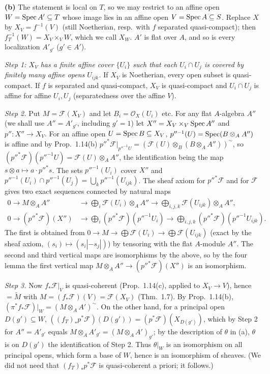 \documentclass[11pt]{article}
\begin{document}
\textbf{(b)} The statement is local on $T$, so we may restrict to an affine open $W=\operatorname{Spec} A'\subseteq T$ whose image lies in an affine open $V=\operatorname{Spec} A\subseteq S$. Replace $X$ by $X_V=f^{-1}(V)$ (still Noetherian, resp.\ with $f$ separated quasi-compact); then $f_T^{-1}(W)=X_V\times_VW$, which we call $X_W$. $A'$ is flat over $A$, and so is every localization $A'_{g'}$ ($g'\in A'$).

\emph{Step 1: $X_V$ has a finite affine cover $\{U_i\}$ such that each $U_i\cap U_j$ is covered by finitely many affine opens $U_{ijk}$.} If $X_V$ is Noetherian, every open subset is quasi-compact. If $f$ is separated and quasi-compact, $X_V$ is quasi-compact and $U_i\cap U_j$ is affine for affine $U_i,U_j$ (separatedness over the affine $V$).

\emph{Step 2.} Put $M=\mathcal F(X_V)$ and let $B_i=\mathcal O_X(U_i)$ etc. For any flat $A$-algebra $A''$ (we shall use $A''=A'_{g'}$, including $g'=1$) let $X''=X_V\times_V\operatorname{Spec} A''$ and $p'':X''\to X_V$. For an affine open $U=\operatorname{Spec} B\subseteq X_V$, $p''^{-1}(U)=\operatorname{Spec}(B\otimes_AA'')$ is affine and by Prop.~1.14(b) $p''^*\mathcal F|_{p''^{-1}U}=(\mathcal F(U)\otimes_B(B\otimes_AA''))^\sim$, so $(p''^*\mathcal F)(p''^{-1}U)=\mathcal F(U)\otimes_AA''$, the identification being the map $s\otimes a\mapsto a\cdot p''^*s$. The sets $p''^{-1}(U_i)$ cover $X''$ and $p''^{-1}(U_i)\cap p''^{-1}(U_j)=\bigcup_kp''^{-1}(U_{ijk})$. The sheaf axiom for $p''^*\mathcal F$ and for $\mathcal F$ gives two exact sequences connected by natural maps
\begin{align*}
0\to M\otimes_AA''&\to\bigoplus_i\mathcal F(U_i)\otimes_AA''\to\bigoplus_{i,j,k}\mathcal F(U_{ijk})\otimes_AA'',\\
0\to(p''^*\mathcal F)(X'')&\to\bigoplus_i(p''^*\mathcal F)(p''^{-1}U_i)\to\bigoplus_{i,j,k}(p''^*\mathcal F)(p''^{-1}U_{ijk}).
\end{align*}
The first is obtained from $0\to M\to\bigoplus\mathcal F(U_i)\to\bigoplus\mathcal F(U_{ijk})$ (exact by the sheaf axiom, $(s_i)\mapsto(s_i|-s_j|)$) by tensoring with the flat $A$-module $A''$. The second and third vertical maps are isomorphisms by the above, so by the four lemma the first vertical map $M\otimes_AA''\to(p''^*\mathcal F)(X'')$ is an isomorphism.

\emph{Step 3.} Now $f_*\mathcal F|_V$ is quasi-coherent (Prop.~1.14(c), applied to $X_V\to V$), hence $=\widetilde M$ with $M=(f_*\mathcal F)(V)=\mathcal F(X_V)$ (Thm.~1.7). By Prop.~1.14(b), $(\pi^*f_*\mathcal F)|_W=(M\otimes_AA')^\sim$. On the other hand, for a principal open $D(g')\subseteq W$, $((f_T)_*p^*\mathcal F)(D(g'))=(p^*\mathcal F)(X_{D(g')})$, which by Step 2 for $A''=A'_{g'}$ equals $M\otimes_AA'_{g'}=(M\otimes_AA')_{g'}$; by the description of $\theta$ in (a), $\theta$ is on $D(g')$ the identification of Step 2. Thus $\theta|_W$ is an isomorphism on all principal opens, which form a base of $W$, hence is an isomorphism of sheaves. (We did not need that $(f_T)_*p^*\mathcal F$ is quasi-coherent a priori; it follows.)
\end{document}
